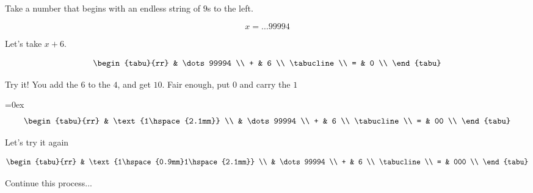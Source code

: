 \begin{example}
  Take a number that begins with an endless string of $9$s to the
  left.

  \begin{displaymath}
    x = \dots99994
  \end{displaymath}

  Let's take $x + 6$.

  \begin{displaymath}
    \begin{tabu}{rr}
        & \dots99994 \\
      + & 6 \\
      \tabucline \\
      = & 0 \\
    \end{tabu}
  \end{displaymath}

  Try it! You add the $6$ to the $4$, and get $10$. Fair enough, put
  $0$ and carry the $1$

  \tabulinesep=0ex
  \begin{displaymath}
    \begin{tabu}{rr}
        & \text{1\hspace{2.1mm}}  \\
        & \dots99994 \\
      + & 6 \\
      \tabucline \\
      = & 00 \\
    \end{tabu}
  \end{displaymath}

  Let's try it again

  \begin{displaymath}
    \begin{tabu}{rr}
        & \text{1\hspace{0.9mm}1\hspace{2.1mm}}  \\
        & \dots99994 \\
      + & 6 \\
      \tabucline \\
      = & 000 \\
    \end{tabu}
  \end{displaymath}

  Continue this process...


\end{example}
